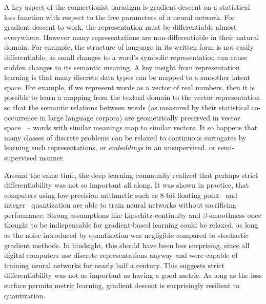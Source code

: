 \documentclass[12pt,initial,twoside,maitrise]{dms}
\numberwithin{equation}{section}
\numberwithin{table}{chapter}
\numberwithin{figure}{chapter}
\begin{document}
A key aspect of the connectionist paradigm is gradient descent on a statistical loss function with respect to the free parameters of a neural network. For gradient descent to work, the representation must be differentiable almost everywhere. However many representations are non-differentiable in their natural domain. For example, the structure of language in its written form is not easily differentiable, as small changes to a word's symbolic representation can cause sudden changes to its semantic meaning. A key insight from representation learning is that many discrete data types can be mapped to a smoother latent space. For example, if we represent words as a vector of real numbers, then it is possible to learn a mapping from the textual domain to the vector representation so that the semantic relations between words (as measured by their statistical co-occurrence in large language corpora) are geometrically preserved in vector space~\citep{pennington2014glove} -- words with similar meanings map to similar vectors. It so happens that many classes of discrete problems can be relaxed to continuous surrogates by learning such representations, or \textit{embeddings} in an unsupervised, or semi-supervised manner.

Around the same time, the deep learning community realized that perhaps strict differentiability was not so important all along. It was shown in practice, that computers using low-precision arithmetic such as 8-bit floating point~\citep{wang2018training} and integer~\citep{jacob2018quantization} quantization are able to train neural networks without sacrificing performance. Strong assumptions like Lipschitz-continuity and $\beta$-smoothness once thought to be indispensable for gradient-based learning could be relaxed, as long as the noise introduced by quantization was negligible compared to stochastic gradient methods. In hindsight, this should have been less surprising, since all digital computers use discrete representations anyway and were capable of training neural networks for nearly half a century. This suggests strict differentiability was not as important as having a good metric. As long as the loss surface permits metric learning, gradient descent is surprisingly resilient to quantization.
\end{document}

